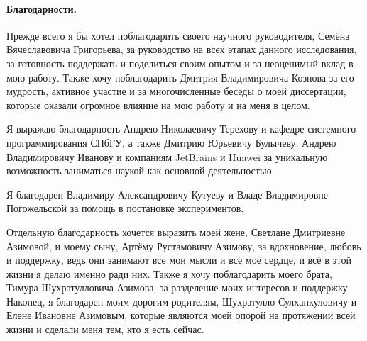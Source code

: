 \paragraph{Благодарности.} Прежде всего я бы хотел поблагодарить своего научного руководителя, Семёна Вячеславовича Григорьева, за руководство на всех этапах данного исследования, за готовность поддержать и поделиться своим опытом и за неоценимый вклад в мою работу. Также хочу поблагодарить Дмитрия Владимировича Кознова за его мудрость, активное участие и за многочисленные беседы о моей диссертации, которые оказали огромное влияние на мою работу и на меня в целом.

Я выражаю благодарность Андрею Николаевичу Терехову и кафедре системного программирования СПбГУ, а также Дмитрию Юрьевичу Булычеву, Андрею Владимировичу Иванову и компаниям JetBrains и Huawei за уникальную возможность заниматься наукой как основной деятельностью.

Я благодарен Владимиру Александровичу Кутуеву и Владе Владимировне Погожельской за помощь в постановке экспериментов.

Отдельную благодарность хочется выразить моей жене, Светлане Дмитриевне Азимовой, и моему сыну, Артёму Рустамовичу Азимову, за вдохновение, любовь и поддержку, ведь они занимают все мои мысли и всё моё сердце, и всё в этой жизни я делаю именно ради них. Также я хочу поблагодарить моего брата, Тимура Шухратулловича Азимова, за разделение моих интересов и поддержку. Наконец, я благодарен моим дорогим родителям, Шухратулло Сулханкуловичу и Елене Ивановне Азимовым, которые являются моей опорой на протяжении всей жизни и сделали меня тем, кто я есть сейчас.
